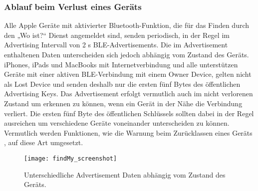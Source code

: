 \subsubsection{Ablauf beim Verlust eines Geräts}
\label{sec:Verlust}

Alle Apple Geräte mit aktivierter Bluetooth-Funktion, die für das Finden durch den „Wo ist?“ Dienst angemeldet sind, senden periodisch, in der Regel im Advertising Intervall von 2 s \ac{BLE}-Advertisements.
Die im Advertisement enthaltenen Daten unterscheiden sich jedoch abhängig vom Zustand des Geräts.
iPhones, iPads und MacBooks mit Internetverbindung und alle unterstützen Geräte mit einer aktiven \ac{BLE}-Verbindung mit einem Owner Device, gelten nicht als Lost Device und senden deshalb nur die ersten fünf Bytes des öffentlichen Advertising Keys.
Das Advertisement erfolgt vermutlich auch im nicht verlorenen Zustand um erkennen zu können, wenn ein Gerät in der Nähe die Verbindung verliert.
Die ersten fünf Byte des öffentlichen Schlüssels sollten dabei in der Regel ausreichen um verschiedene Geräte voneinander unterscheiden zu können.
Vermutlich werden Funktionen, wie die Warnung beim Zurücklassen eines Geräts \cite{Apple_FindMyWarning}, auf diese Art umgesetzt.
\begin{figure}[ht]
    \centering
    \texttt{[image: findMy\_screenshot]}
    \caption{Unterschiedliche Advertisement Daten abhängig vom Zustand des Geräts.}
    \label{fig:findMy_screenshot}
\end{figure}

